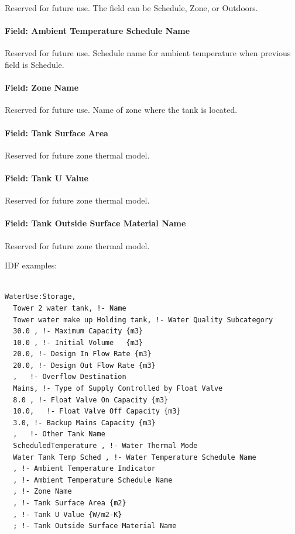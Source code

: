 Reserved for future use. The field can be Schedule, Zone, or Outdoors.

\paragraph{Field: Ambient Temperature Schedule Name}\label{field-ambient-temperature-schedule-name-002}

Reserved for future use. Schedule name for ambient temperature when previous field is Schedule.

\paragraph{Field: Zone Name}\label{field-zone-name-1-010}

Reserved for future use. Name of zone where the tank is located.

\paragraph{Field: Tank Surface Area}\label{field-tank-surface-area}

Reserved for future zone thermal model.

\paragraph{Field: Tank U Value}\label{field-tank-u-value}

Reserved for future zone thermal model.

\paragraph{Field: Tank Outside Surface Material Name}\label{field-tank-outside-surface-material-name}

Reserved for future zone thermal model.

IDF examples:

\begin{lstlisting}

WaterUse:Storage,
  Tower 2 water tank, !- Name
  Tower water make up Holding tank, !- Water Quality Subcategory
  30.0 , !- Maximum Capacity {m3}
  10.0 , !- Initial Volume   {m3}
  20.0, !- Design In Flow Rate {m3}
  20.0, !- Design Out Flow Rate {m3}
  ,   !- Overflow Destination
  Mains, !- Type of Supply Controlled by Float Valve
  8.0 , !- Float Valve On Capacity {m3}
  10.0,   !- Float Valve Off Capacity {m3}
  3.0, !- Backup Mains Capacity {m3}
  ,   !- Other Tank Name
  ScheduledTemperature , !- Water Thermal Mode
  Water Tank Temp Sched , !- Water Temperature Schedule Name
  , !- Ambient Temperature Indicator
  , !- Ambient Temperature Schedule Name
  , !- Zone Name
  , !- Tank Surface Area {m2}
  , !- Tank U Value {W/m2-K}
  ; !- Tank Outside Surface Material Name
\end{lstlisting}

